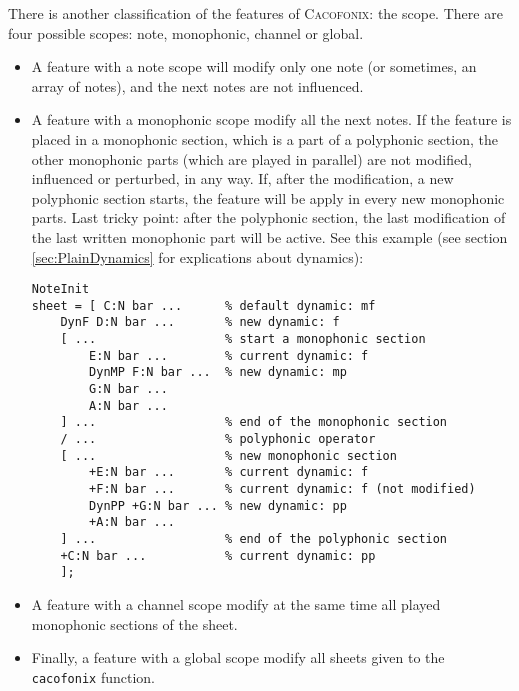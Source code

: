 \documentclass{article}
\newcommand\cacofonix{\textsc{Cacofonix}\xspace}
\begin{document}
There is another classification of the features of \cacofonix: the scope. There are four possible scopes: note, monophonic, channel or global.
\begin{itemize}
	\item A feature with a note scope will modify only one note (or sometimes, an array of notes), and the next notes are not influenced.
	\item A feature with a monophonic scope modify all the next notes. If the feature is placed in a monophonic section, which is a part of a polyphonic section, the other monophonic parts (which are played in parallel) are not modified, influenced or perturbed, in any way. If, after the modification, a new polyphonic section starts, the feature will be apply in every new monophonic parts. Last tricky point: after the polyphonic section, the last modification of the last written monophonic part will be active. See this example (see section \ref{sec:PlainDynamics} for explications about dynamics):
\begin{lstlisting}
NoteInit
sheet = [ C:N bar ...      % default dynamic: mf
	DynF D:N bar ...       % new dynamic: f
	[ ...                  % start a monophonic section
		E:N bar ...        % current dynamic: f
		DynMP F:N bar ...  % new dynamic: mp
		G:N bar ... 
		A:N bar ...
	] ...                  % end of the monophonic section
	/ ...                  % polyphonic operator
	[ ...                  % new monophonic section
		+E:N bar ...       % current dynamic: f
		+F:N bar ...       % current dynamic: f (not modified)
		DynPP +G:N bar ... % new dynamic: pp
		+A:N bar ...
	] ...                  % end of the polyphonic section
	+C:N bar ...           % current dynamic: pp
	];
\end{lstlisting}
	\item A feature with a channel scope modify at the same time all played monophonic sections of the sheet.
	\item Finally, a feature with a global scope modify all sheets given to the \lstinline!cacofonix! function.
\end{itemize}
\end{document}
